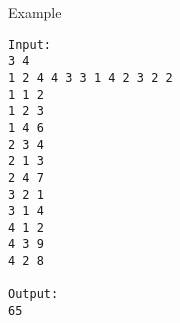 Example
\begin{verbatim}
Input:
3 4
1 2 4 4 3 3 1 4 2 3 2 2
1 1 2
1 2 3
1 4 6
2 3 4
2 1 3
2 4 7
3 2 1
3 1 4
4 1 2
4 3 9
4 2 8

Output:
65
\end{verbatim}